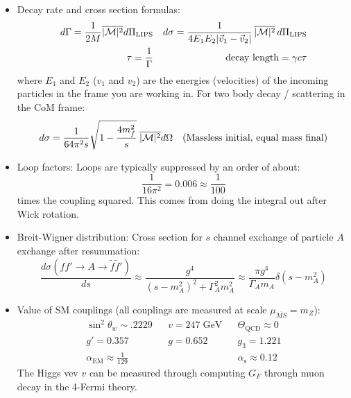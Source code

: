 \documentclass[11pt, oneside]{article}   	%
\theoremstyle{definition}
\numberwithin{equation}{subsection}		%
\begin{document}
\begin{itemize}
	\item Decay rate and cross section formulas:
	\begin{align}
		d\Gamma = \frac{1}{2 M} \overline{|\mathcal M|^2} d\Pi_\mathrm{LIPS} && d\sigma = \frac{1}{4 E_1 E_2 |\vec v_1 - \vec v_2|}\,
		\overline{|\mathcal M|^2}\,d\Pi_\mathrm{LIPS}
		\\
		 \tau = \frac{1}{\Gamma} && \textnormal{decay length} = \gamma c\tau
	\end{align}
	where $E_1$ and $E_2$ ($v_1$ and $v_2$) are the energies (velocities) of the incoming particles in the frame you are working in. 
	For two body decay / scattering in the CoM frame:
	\begin{align}
	d\sigma = \frac{1}{64\pi^2 s}\sqrt{1 - \frac{4 m_f^2}{s}} \;\overline{|\mathcal M|^2} d\Omega && (\textnormal{Massless initial, equal mass 
	final}) 
	\end{align}
	
	\item Loop factors: Loops are typically suppressed by an order of about:
	\begin{equation}
		\frac{1}{16\pi^2} = 0.006\approx \frac{1}{100}
	\end{equation}
	times the coupling squared. This comes from doing the integral out after Wick rotation.
	
	\item Breit-Wigner distribution: Cross section for $s$ channel exchange of particle $A$ exchange after resummation:
	\begin{equation}
		\frac{d\sigma(ff'\rightarrow A\rightarrow \tilde f\tilde f')}{ds}\approx \frac{g^4}{(s - m_A^2)^2 + \Gamma_A^2 m_A^2} \approx \frac{\pi g^4}{\Gamma_A m_A}\delta(s - m_A^2)
	\end{equation}
	
	\item Value of SM couplings (all couplings are measured at scale $\mu_{\overline{MS}} = m_Z$):
	\begin{align}
		\sin^2\theta_w \sim .2229 && v = 247\;\mathrm{GeV} && \Theta_\mathrm{QCD}\approx 0 \\
		g' = 0.357 && g = 0.652 && g_3 = 1.221 \\
		\alpha_\mathrm{EM}\approx\frac{1}{129} &&  && \alpha_\mathrm{s} \approx 0.12
	\end{align}
	The Higgs vev $v$ can be measured through computing $G_F$ through muon decay in the 4-Fermi theory.


\end{itemize}
\end{document}
